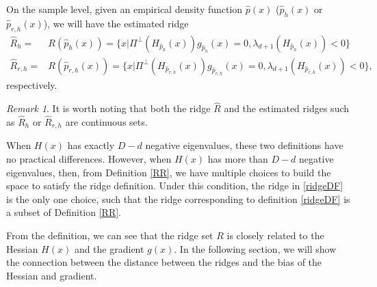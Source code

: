 \documentclass[aos,preprint]{imsart}
\theoremstyle{remark}
\newtheorem*{remark}{Remark}
\begin{document}
On the sample level, given an empirical density function $\hat{p}(x)$ ($\hat{p}_h(x)$ or $\hat{p}_{r, h}(x)$),  we will have the estimated ridge 
\begin{align*}
\hat{R}_h =&R(\hat{p}_h(x))= \{x| \Pi^{\perp}(H_{\hat{p}_{h}}(x)) g_{\hat{p}_{h}}(x) = 0, \lambda_{d+1}(H_{\hat{p}_{h}}(x))<0\}\\
\hat{R}_{r, h}=& R(\hat{p}_{r,h}(x))=\{x| \Pi^{\perp}(H_{\hat{p}_{r,h}}(x)) g_{\hat{p}_{r,h}}(x) = 0, \lambda_{d+1}(H_{\hat{p}_{r,h}}(x))<0\},
\end{align*} 
respectively. 

\begin{remark}   
It is worth noting that both the ridge $\hat{R}$ and the estimated ridges such as $\hat{R}_h$ or $\hat{R}_{r,h}$ are continuous sets.
\end{remark}

When $H(x)$ has exactly $D-d$ negative eigenvalues, these two definitions have no practical differences. However, when $H(x)$ has more than $D-d$ negative eigenvalues, then, from Definition \ref{RR}, we have multiple choices to build the space to satisfy the ridge definition. Under this condition, the ridge in \eqref{ridgeDF} is the only one choice, such that the ridge corresponding to definition \eqref{ridgeDF} is a subset of Definition \ref{RR}.

From the definition, we can see that the ridge set $R$ is closely related to the Hessian $H(x)$ and the gradient $g(x)$. In the following section, we will show the connection between the distance between the ridges and the bias of the Hessian and gradient. 
\end{document}
